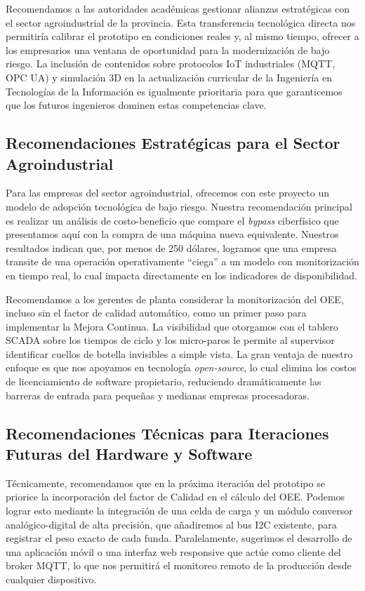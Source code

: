 Recomendamos a las autoridades académicas gestionar alianzas estratégicas con el sector agroindustrial de la provincia. Esta transferencia tecnológica directa nos permitiría calibrar el prototipo en condiciones reales y, al mismo tiempo, ofrecer a los empresarios una ventana de oportunidad para la modernización de bajo riesgo. La inclusión de contenidos sobre protocolos IoT industriales (MQTT, OPC UA) y simulación 3D en la actualización curricular de la Ingeniería en Tecnologías de la Información es igualmente prioritaria para que garanticemos que los futuros ingenieros dominen estas competencias clave.

\subsection{Recomendaciones Estratégicas para el Sector Agroindustrial}

Para las empresas del sector agroindustrial, ofrecemos con este proyecto un modelo de adopción tecnológica de bajo riesgo. Nuestra recomendación principal es realizar un análisis de costo-beneficio que compare el \textit{bypass} ciberfísico que presentamos aquí con la compra de una máquina nueva equivalente. Nuestros resultados indican que, por menos de 250 dólares, logramos que una empresa transite de una operación operativamente \enquote{ciega} a un modelo con monitorización en tiempo real, lo cual impacta directamente en los indicadores de disponibilidad.

Recomendamos a los gerentes de planta considerar la monitorización del OEE, incluso sin el factor de calidad automático, como un primer paso para implementar la Mejora Continua. La visibilidad que otorgamos con el tablero SCADA sobre los tiempos de ciclo y los micro-paros le permite al supervisor identificar cuellos de botella invisibles a simple vista. La gran ventaja de nuestro enfoque es que nos apoyamos en tecnología \textit{open-source}, lo cual elimina los costos de licenciamiento de software propietario, reduciendo dramáticamente las barreras de entrada para pequeñas y medianas empresas procesadoras.

\subsection{Recomendaciones Técnicas para Iteraciones Futuras del Hardware y Software}

Técnicamente, recomendamos que en la próxima iteración del prototipo se priorice la incorporación del factor de Calidad en el cálculo del OEE. Podemos lograr esto mediante la integración de una celda de carga y un módulo conversor analógico-digital de alta precisión, que añadiremos al bus I2C existente, para registrar el peso exacto de cada funda. Paralelamente, sugerimos el desarrollo de una aplicación móvil o una interfaz web responsive que actúe como cliente del broker MQTT, lo que nos permitirá el monitoreo remoto de la producción desde cualquier dispositivo.


